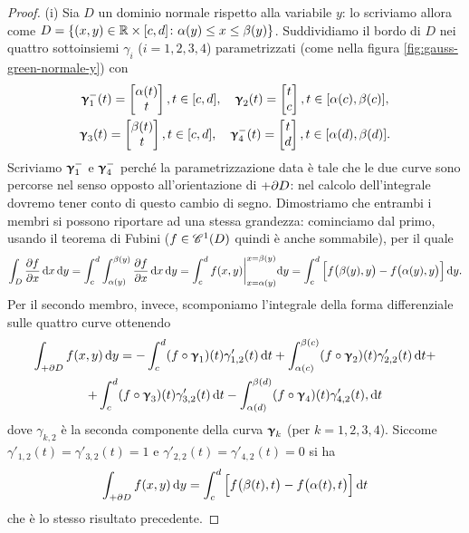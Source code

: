 \begin{proof}
	
	(i) Sia $D$ un dominio normale rispetto alla variabile $y$: lo scriviamo allora come $D=\{(x,y)\in\R\times[c,d]\colon \alpha(y)\leq x\leq\beta(y)\}$.
	Suddividiamo il bordo di $D$ nei quattro sottoinsiemi $\gamma_i$ ($i=1,2,3,4$) parametrizzati (come nella figura \ref{fig:gauss-green-normale-y}) con
	\begin{gather*}
		\vgamma_1^-(t)=
		\begin{bmatrix}
			\alpha(t)\\t
		\end{bmatrix}, t\in[c,d],\quad
		\vgamma_2(t)=
		\begin{bmatrix}
			t\\c
		\end{bmatrix}, t\in[\alpha(c),\beta(c)],\\
		\vgamma_3(t)=
		\begin{bmatrix}
			\beta(t)\\t
		\end{bmatrix}, t\in[c,d],\quad 
		\vgamma_4^-(t)=
		\begin{bmatrix}
			t\\d
		\end{bmatrix}, t\in[\alpha(d),\beta(d)].
	\end{gather*}
	Scriviamo $\vgamma_1^-$ e $\vgamma_4^-$ perch\'e la parametrizzazione data è tale che le due curve sono percorse nel senso opposto all'orientazione di $+\boundary D$: nel calcolo dell'integrale dovremo tener conto di questo cambio di segno.
	Dimostriamo che entrambi i membri si possono riportare ad una stessa grandezza: cominciamo dal primo, usando il teorema di Fubini ($f\in\cont[1]{D}$ quindi è anche sommabile), per il quale
	\begin{equation}
		\int_D\drp{f}{x}\,\dd x\,\dd y=\int_c^d\int_{\alpha(y)}^{\beta(y)}\drp{f}{x}\,\dd x\,\dd y=\int_c^df(x,y)\bigg|_{x=\alpha(y)}^{x=\beta(y)}\dd y=\int_c^d\Big[f\big(\beta(y),y\big)-f\big(\alpha(y),y\big)\Big]\,\dd y.
	\end{equation}
	Per il secondo membro, invece, scomponiamo l'integrale della forma differenziale sulle quattro curve ottenendo
	\begin{multline}
		\int_{+\boundary D}f(x,y)\,\dd y=
		-\int_c^d(f\circ\vgamma_1)(t)\gamma'_{1,2}(t)\,\dd t
		+\int_{\alpha(c)}^{\beta(c)}(f\circ\vgamma_2)(t)\gamma'_{2,2}(t)\,\dd t+\\
		+\int_c^d(f\circ\vgamma_3)(t)\gamma'_{3,2}(t)\,\dd t
		-\int_{\alpha(d)}^{\beta(d)}(f\circ\vgamma_4)(t)\gamma'_{4,2}(t),\dd t
	\end{multline}
	dove $\gamma_{k,2}$ è la seconda componente della curva $\vgamma_k$ (per $k=1,2,3,4$).
	Siccome $\gamma'_{1,2}(t)=\gamma'_{3,2}(t)=1$ e $\gamma'_{2,2}(t)=\gamma'_{4,2}(t)=0$ si ha
	\begin{equation}
		\int_{+\boundary D}f(x,y)\,\dd y=\int_c^d\Big[f\big(\beta(t),t\big)-f\big(\alpha(t),t\big)\Big]\,\dd t
	\end{equation}
	che è lo stesso risultato precedente.


\end{proof}
